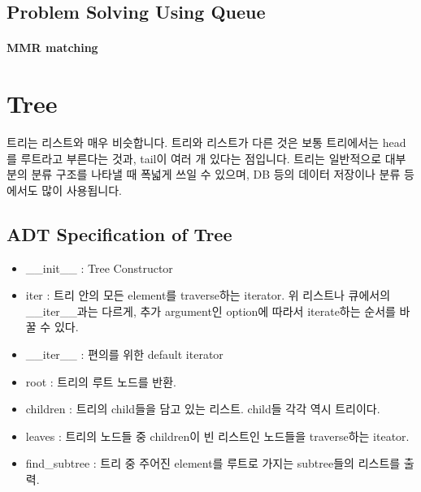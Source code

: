 \documentclass[titlepage]{report}
\begin{document}
\subsection{Problem Solving Using Queue} 

\paragraph{MMR matching} 

\section{Tree} 


트리는 리스트와 매우 비슷합니다. 트리와 리스트가 다른 것은 보통 트리에서는 head를 루트라고 부른다는 것과, tail이 여러 개 있다는 점입니다. 트리는 일반적으로 대부분의 분류 구조를 나타낼 때 폭넓게 쓰일 수 있으며, DB 등의 데이터 저장이나 분류 등에서도 많이 사용됩니다. 

\subsection{ADT Specification of Tree} 


\begin{itemize} 
\item \_\_init\_\_ : Tree Constructor 
\item iter : 트리 안의 모든 element를 traverse하는 iterator. 위 리스트나 큐에서의 \_\_iter\_\_과는 다르게, 추가 argument인 option에 따라서 iterate하는 순서를 바꿀 수 있다. 
\item \_\_iter\_\_ : 편의를 위한 default iterator 
\item root : 트리의 루트 노드를 반환. 
\item children : 트리의 child들을 담고 있는 리스트. child들 각각 역시 트리이다. 
\item leaves : 트리의 노드들 중 children이 빈 리스트인 노드들을 traverse하는 iteator. 
\item find\_subtree : 트리 중 주어진 element를 루트로 가지는 subtree들의 리스트를 출력. 
\end{itemize}

%
%
\end{document}
